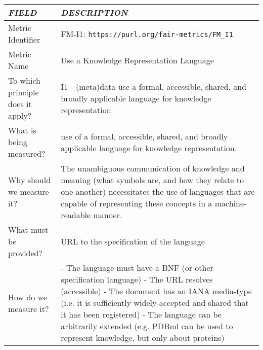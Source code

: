 \documentclass[english]{article}
\begin{document}
\begin{longtable}{|p{5cm}|p{9cm}|}


\hline
\emph{FIELD} & \emph{DESCRIPTION} \\
\hline
Metric Identifier &   FM-I1: \verb"https://purl.org/fair-metrics/FM_I1"
\\


\hline
Metric Name &   

Use a Knowledge Representation Language


 \\



\hline
To which principle does it apply? &   



I1 - (meta)data use a formal, accessible, shared, and broadly applicable language for knowledge representation

\\



\hline
What is being measured? & 



use of a formal, accessible, shared, and broadly applicable language for knowledge representation.


\\



\hline
Why should we measure it? & 




The unambiguous communication of knowledge and meaning (what symbols are, and how they relate to one another) necessitates the use of languages that are capable of representing these concepts in a machine-readable manner.  
  
\\



\hline
What must be provided? &  

URL to the specification of the language


\\



\hline
How do we measure it? &  

- The language must have a BNF (or other specification language) \newline 
- The URL resolves (accessible) \newline 
- The document has an IANA media-type (i.e. it is sufficiently widely-accepted and shared that it has been registered) \newline 
- The language can be arbitrarily extended (e.g. PDBml can be used to represent knowledge, but only about proteins) \newline 




\end{longtable}
\end{document}
